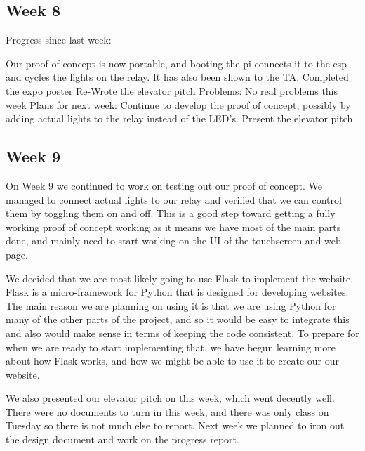 \documentclass[letterpaper,10pt]{article}
\begin{document}
\subsection{Week 8}
 
Progress since last week: 
 
Our proof of concept is now portable, and booting the pi connects it to the esp and cycles the lights on the relay. It has also been shown to the TA. 
Completed the expo poster 
Re-Wrote the elevator pitch 
Problems: 
No real problems this week 
Plans for next week: 
Continue to develop the proof of concept, possibly by adding actual lights to the relay instead of the LED's. 
Present the elevator pitch 

\subsection{Week 9}
 
On Week 9 we continued to work on testing out our proof of concept. We managed to connect actual lights to our relay and verified that we can control them by toggling them on and off. This is a good step toward getting a fully working proof of concept working as it means we have most of the main parts done, and mainly need to start working on the UI of the touchscreen and web page.

We decided that we are most likely going to use Flask to implement the website. Flask is a micro-framework for Python that is designed for developing websites. The main reason we are planning on using it is that we are using Python for many of the other parts of the project, and so it would be easy to integrate this and also would make sense in terms of keeping the code consistent. To prepare for when we are ready to start implementing that, we have begun learning more about how Flask works, and how we might be able to use it to create our our website.

We also presented our elevator pitch on this week, which went decently well. There were no documents to turn in this week, and there was only class on Tuesday so there is not much else to report. Next week we planned to iron out the design document and work on the progress report. 

\end{document}
